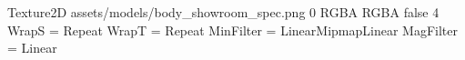 Texture2D
assets/models/body_showroom_spec.png
0
RGBA
RGBA
false
4
WrapS = Repeat
WrapT = Repeat
MinFilter = LinearMipmapLinear
MagFilter = Linear
